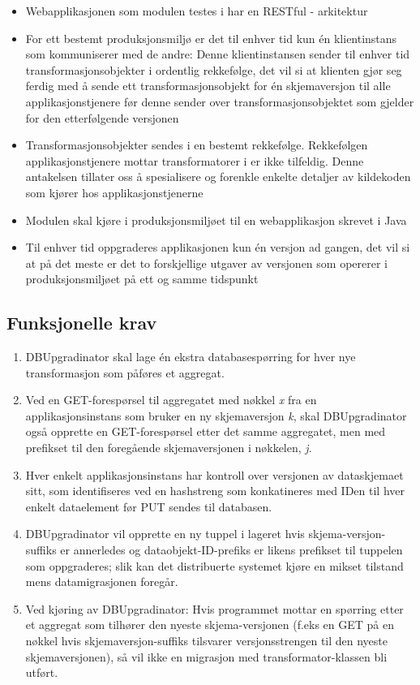 \begin{itemize}
  \item Webapplikasjonen som modulen testes i har en RESTful - arkitektur
  \item For ett bestemt produksjonsmiljø er det til enhver tid kun én klientinstans som kommuniserer med de andre: Denne klientinstansen sender til enhver tid transformasjonsobjekter i ordentlig rekkefølge, det vil si at klienten gjør seg ferdig med å sende ett transformasjonsobjekt for én skjemaversjon til alle applikasjonstjenere før denne sender over transformasjonsobjektet som gjelder for den etterfølgende versjonen
  \item Transformasjonsobjekter sendes i en bestemt rekkefølge. Rekkefølgen applikasjonstjenere mottar transformatorer i er ikke tilfeldig. Denne antakelsen tillater oss å spesialisere og forenkle enkelte detaljer av kildekoden som kjører hos applikasjonstjenerne
  \item Modulen skal kjøre i produksjonsmiljøet til en webapplikasjon skrevet i Java
  \item Til enhver tid oppgraderes applikasjonen kun én versjon ad gangen, det vil si at på det meste er det to forskjellige utgaver av versjonen som opererer i produksjonsmiljøet på ett og samme tidspunkt
\end{itemize}

\subsection{Funksjonelle krav}

\begin{enumerate}
  \item DBUpgradinator skal lage én ekstra databasespørring for hver nye transformasjon som påføres et aggregat.
  \item Ved en GET-forespørsel til aggregatet med nøkkel \emph{x} fra en applikasjonsinstans som bruker en ny skjemaversjon \emph{k}, skal DBUpgradinator også opprette en GET-forespørsel etter det samme aggregatet, men med prefikset til den foregående skjemaversjonen i nøkkelen, \emph{j}.
  \item Hver enkelt applikasjonsinstans har kontroll over versjonen av dataskjemaet sitt, som identifiseres ved en hashstreng som konkatineres med IDen til hver enkelt dataelement før PUT sendes til databasen.
  \item DBUpgradinator vil opprette en ny tuppel i lageret hvis skjema-versjon-suffiks er annerledes og dataobjekt-ID-prefiks er likens prefikset til tuppelen som oppgraderes; slik kan det distribuerte systemet kjøre en mikset tilstand mens datamigrasjonen foregår.
  \item Ved kjøring av DBUpgradinator: Hvis programmet mottar en spørring etter et aggregat som tilhører den nyeste skjema-versjonen (f.eks en GET på en nøkkel hvis skjemaversjon-suffiks tilsvarer versjonsstrengen til den nyeste skjemaversjonen), så vil ikke en migrasjon med transformator-klassen bli utført.
\end{enumerate}

